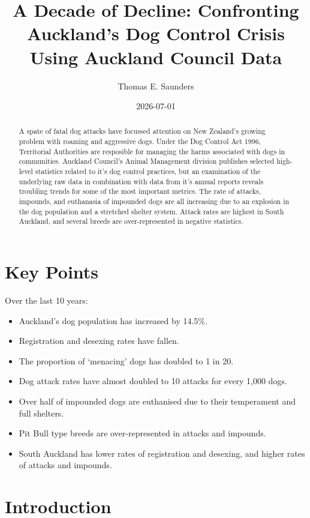 \documentclass[
  letterpaper,
  DIV=11,
  numbers=noendperiod]{scrartcl}
\title{A Decade of Decline: Confronting Auckland's Dog Control Crisis
Using Auckland Council Data}
\author{Thomas E. Saunders}
\date{2026-07-01}
\providecommand{\tightlist}{%
  \setlength{\itemsep}{0pt}\setlength{\parskip}{0pt}}
\begin{document}
\maketitle
\begin{abstract}
A spate of fatal dog attacks have focussed attention on New Zealand's
growing problem with roaming and aggressive dogs. Under the Dog Control
Act 1996, Territorial Authorities are resposible for managing the harms
associated with dogs in communities. Auckland Council's Animal
Management division publishes selected high-level statistics related to
it's dog control practices, but an examination of the underlying raw
data in combination with data from it's annual reports reveals troubling
trends for some of the most important metrics. The rate of attacks,
impounds, and euthanasia of impounded dogs are all increasing due to an
explosion in the dog population and a stretched shelter system. Attack
rates are highest in South Auckland, and several breeds are
over-represented in negative statistics.
\end{abstract}


\section{Key Points}\label{key-points}

Over the last 10 years:

\begin{itemize}
\tightlist
\item
  Auckland's dog population has increased by 14.5\%.
\item
  Registration and desexing rates have fallen.
\item
  The proportion of `menacing' dogs has doubled to 1 in 20.
\item
  Dog attack rates have almost doubled to 10 attacks for every 1,000
  dogs.
\item
  Over half of impounded dogs are euthanised due to their temperament
  and full shelters.
\item
  Pit Bull type breeds are over-represented in attacks and impounds.
\item
  South Auckland has lower rates of registration and desexing, and
  higher rates of attacks and impounds.
\end{itemize}

\section{Introduction}\label{introduction}
\end{document}
